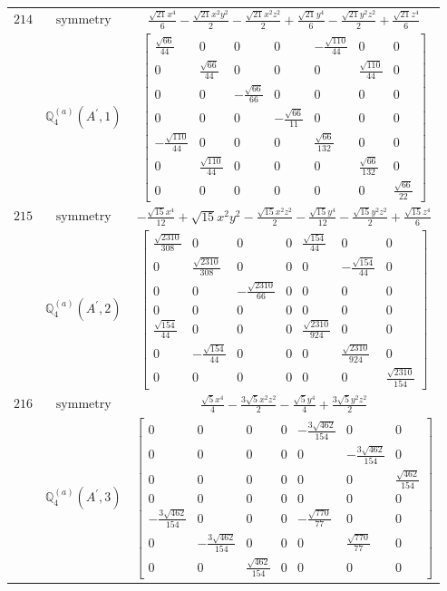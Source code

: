 \documentclass[fleqn,8pt,landscape]{jsarticle}
\begin{document}
\begin{longtable}{ccc}
$ 214 $ & $ \text{symmetry} $ & $ \frac{\sqrt{21} x^{4}}{6} - \frac{\sqrt{21} x^{2} y^{2}}{2} - \frac{\sqrt{21} x^{2} z^{2}}{2} + \frac{\sqrt{21} y^{4}}{6} - \frac{\sqrt{21} y^{2} z^{2}}{2} + \frac{\sqrt{21} z^{4}}{6} $ \\
$  $ & $ \mathbb{Q}_{4}^{(a)}(A^{\prime},1) $ & $ \begin{bmatrix} \frac{\sqrt{66}}{44} & 0 & 0 & 0 & - \frac{\sqrt{110}}{44} & 0 & 0 \\ 0 & \frac{\sqrt{66}}{44} & 0 & 0 & 0 & \frac{\sqrt{110}}{44} & 0 \\ 0 & 0 & - \frac{\sqrt{66}}{66} & 0 & 0 & 0 & 0 \\ 0 & 0 & 0 & - \frac{\sqrt{66}}{11} & 0 & 0 & 0 \\ - \frac{\sqrt{110}}{44} & 0 & 0 & 0 & \frac{\sqrt{66}}{132} & 0 & 0 \\ 0 & \frac{\sqrt{110}}{44} & 0 & 0 & 0 & \frac{\sqrt{66}}{132} & 0 \\ 0 & 0 & 0 & 0 & 0 & 0 & \frac{\sqrt{66}}{22} \end{bmatrix} $ \\ \hline
$ 215 $ & $ \text{symmetry} $ & $ - \frac{\sqrt{15} x^{4}}{12} + \sqrt{15} x^{2} y^{2} - \frac{\sqrt{15} x^{2} z^{2}}{2} - \frac{\sqrt{15} y^{4}}{12} - \frac{\sqrt{15} y^{2} z^{2}}{2} + \frac{\sqrt{15} z^{4}}{6} $ \\
$  $ & $ \mathbb{Q}_{4}^{(a)}(A^{\prime},2) $ & $ \begin{bmatrix} \frac{\sqrt{2310}}{308} & 0 & 0 & 0 & \frac{\sqrt{154}}{44} & 0 & 0 \\ 0 & \frac{\sqrt{2310}}{308} & 0 & 0 & 0 & - \frac{\sqrt{154}}{44} & 0 \\ 0 & 0 & - \frac{\sqrt{2310}}{66} & 0 & 0 & 0 & 0 \\ 0 & 0 & 0 & 0 & 0 & 0 & 0 \\ \frac{\sqrt{154}}{44} & 0 & 0 & 0 & \frac{\sqrt{2310}}{924} & 0 & 0 \\ 0 & - \frac{\sqrt{154}}{44} & 0 & 0 & 0 & \frac{\sqrt{2310}}{924} & 0 \\ 0 & 0 & 0 & 0 & 0 & 0 & \frac{\sqrt{2310}}{154} \end{bmatrix} $ \\ \hline
$ 216 $ & $ \text{symmetry} $ & $ \frac{\sqrt{5} x^{4}}{4} - \frac{3 \sqrt{5} x^{2} z^{2}}{2} - \frac{\sqrt{5} y^{4}}{4} + \frac{3 \sqrt{5} y^{2} z^{2}}{2} $ \\
$  $ & $ \mathbb{Q}_{4}^{(a)}(A^{\prime},3) $ & $ \begin{bmatrix} 0 & 0 & 0 & 0 & - \frac{3 \sqrt{462}}{154} & 0 & 0 \\ 0 & 0 & 0 & 0 & 0 & - \frac{3 \sqrt{462}}{154} & 0 \\ 0 & 0 & 0 & 0 & 0 & 0 & \frac{\sqrt{462}}{154} \\ 0 & 0 & 0 & 0 & 0 & 0 & 0 \\ - \frac{3 \sqrt{462}}{154} & 0 & 0 & 0 & - \frac{\sqrt{770}}{77} & 0 & 0 \\ 0 & - \frac{3 \sqrt{462}}{154} & 0 & 0 & 0 & \frac{\sqrt{770}}{77} & 0 \\ 0 & 0 & \frac{\sqrt{462}}{154} & 0 & 0 & 0 & 0 \end{bmatrix} $ \\ \hline

\end{longtable}
\end{document}
